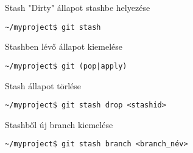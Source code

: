 
\begin{frame}[fragile]{Stash}
    \pause
    "Dirty" állapot stashbe helyezése
\small\begin{verbatim}
~/myproject$ git stash
\end{verbatim}\normalsize

    \pause
    Stashben lévő állapot kiemelése
\small\begin{verbatim}
~/myproject$ git (pop|apply)
\end{verbatim}\normalsize

    \pause
    Stash állapot törlése
\small\begin{verbatim}
~/myproject$ git stash drop <stashid>
\end{verbatim}\normalsize

    \pause
    Stashből új branch kiemelése
\small\begin{verbatim}
~/myproject$ git stash branch <branch_név>
\end{verbatim}\normalsize
\end{frame}

